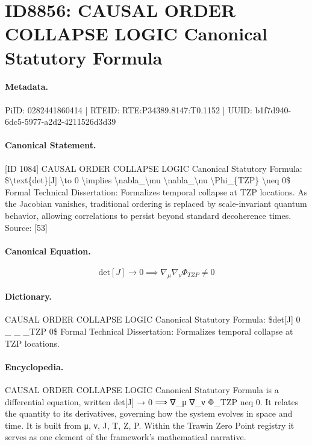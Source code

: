 \section*{ID8856: CAUSAL ORDER COLLAPSE LOGIC Canonical Statutory Formula}
\paragraph{Metadata.}
PiID: 0282441860414 | RTEID: RTE:P34389.8147:T0.1152 | UUID: b1f7d940-6dc5-5977-a2d2-4211526d3d39

\paragraph{Canonical Statement.}
[ID 1084] CAUSAL ORDER COLLAPSE LOGIC Canonical Statutory Formula: \$\textbackslash{}text\{det\}[J] \textbackslash{}to 0 \textbackslash{}implies \textbackslash{}nabla\_\textbackslash{}mu \textbackslash{}nabla\_\textbackslash{}nu \textbackslash{}Phi\_\{TZP\} \textbackslash{}neq 0\$ Formal Technical Dissertation: Formalizes temporal collapse at TZP locations. As the Jacobian vanishes, traditional ordering is replaced by scale-invariant quantum behavior, allowing correlations to persist beyond standard decoherence times. Source: [53]

\paragraph{Canonical Equation.}
\[
\text{det}[J] \to 0 \implies \nabla_\mu \nabla_\nu \Phi_{TZP} \neq 0
\]

\paragraph{Dictionary.}
CAUSAL ORDER COLLAPSE LOGIC Canonical Statutory Formula: \$det[J] 0 \_ \_ \_TZP 0\$ Formal Technical Dissertation: Formalizes temporal collapse at TZP locations.

\paragraph{Encyclopedia.}
CAUSAL ORDER COLLAPSE LOGIC Canonical Statutory Formula is a differential equation, written det[J] → 0 ⟹ ∇\_μ ∇\_ν Φ\_TZP neq 0. It relates the quantity to its derivatives, governing how the system evolves in space and time. It is built from μ, ν, J, T, Z, P. Within the Trawin Zero Point registry it serves as one element of the framework's mathematical narrative.
